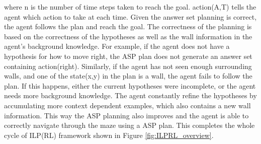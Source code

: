 where \textsf{n} is the number of time steps taken to reach the goal. 
\textsf{action(A,T)} tells the agent which action to take at each time.
Given the answer set planning is correct, the agent follows the plan and reach the goal. 
The correctness of the planning is based on the correctness of the hypotheses as well as the wall information in the agent's background knowledge. 
For example, if the agent does not have a hypothesis for how to move right, the ASP plan does not generate an answer set containing \textsf{action(right)}. Similarly, if the agent has not seen enough surrounding walls, and one of the \textsf{state(x,y)} in the plan is a wall, the agent fails to follow the plan. If this happens, either the current hypotheses were incomplete, or the agent needs more background knowledge.
The agent constantly refine the hypotheses by accumulating more context dependent examples, which also contains a new wall information. This way the ASP planning also improves and the agent is able to correctly navigate through the maze using a ASP plan.
This completes the whole cycle of ILP(RL) framework shown in Figure \ref{fig:ILPRL_overview}.
